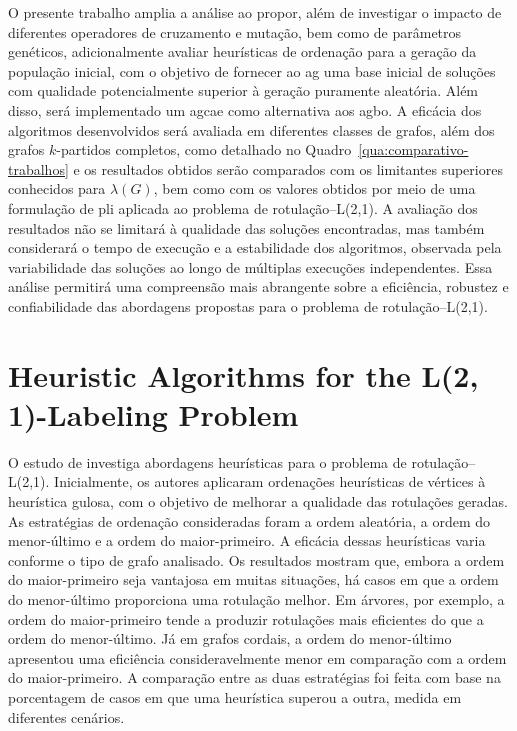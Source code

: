 O presente trabalho amplia a análise ao propor, além de investigar o impacto de diferentes operadores de cruzamento e mutação, bem como de parâmetros genéticos, adicionalmente avaliar heurísticas de ordenação para a geração da população inicial, com o objetivo de fornecer ao \gls{ag} uma base inicial de soluções com qualidade potencialmente superior à geração puramente aleatória. Além disso, será implementado um \gls{agcae} como alternativa aos \gls{agbo}. A eficácia dos algoritmos desenvolvidos será avaliada em diferentes classes de grafos, além dos grafos $k$-partidos completos, como detalhado no Quadro~\ref{qua:comparativo-trabalhos} e os resultados obtidos serão comparados com os limitantes superiores conhecidos para $\lambda(G)$, bem como com os valores obtidos por meio de uma formulação de \gls{pli} aplicada ao problema de rotulação–L(2,1). A avaliação dos resultados não se limitará à qualidade das soluções encontradas, mas também considerará o tempo de execução e a estabilidade dos algoritmos, observada pela variabilidade das soluções ao longo de múltiplas execuções independentes. Essa análise permitirá uma compreensão mais abrangente sobre a eficiência, robustez e confiabilidade das abordagens propostas para o problema de rotulação–L(2,1).

\section{Heuristic Algorithms for the L(2, 1)-Labeling Problem}

O estudo de  investiga abordagens heurísticas para o problema de rotulação–L(2,1). Inicialmente, os autores aplicaram ordenações heurísticas de vértices à heurística gulosa, com o objetivo de melhorar a qualidade das rotulações geradas. As estratégias de ordenação consideradas foram a ordem aleatória, a ordem do menor-último e a ordem do maior-primeiro. A eficácia dessas heurísticas varia conforme o tipo de grafo analisado. Os resultados mostram que, embora a ordem do maior-primeiro seja vantajosa em muitas situações, há casos em que a ordem do menor-último proporciona uma rotulação melhor. Em árvores, por exemplo, a ordem do maior-primeiro tende a produzir rotulações mais eficientes do que a ordem do menor-último. Já em grafos cordais, a ordem do menor-último apresentou uma eficiência consideravelmente menor em comparação com a ordem do maior-primeiro. A comparação entre as duas estratégias foi feita com base na porcentagem de casos em que uma heurística superou a outra, medida em diferentes cenários.

